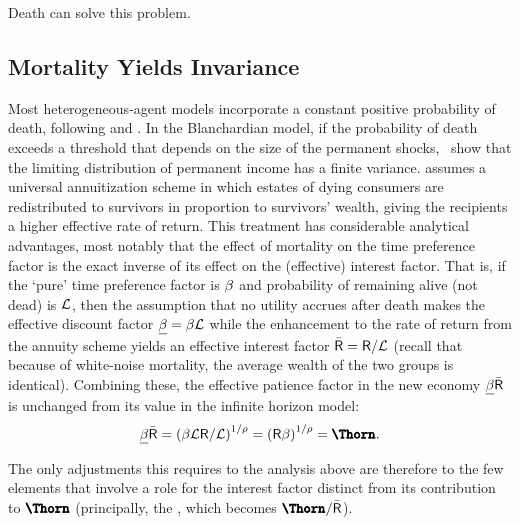 \documentclass[BufferStockTheory]{subfiles}
\begin{document}
Death can solve this problem.


\hypertarget{Mortality}{}
\subsection{Mortality Yields Invariance}\label{sec:Mortality}

\hypertarget{Blanchard-Lives}{}
Most heterogeneous-agent models incorporate a constant positive probability of death, following \cite{blanchardFinite} and \cite{yaari1965uncertain}.  In the Blanchardian model, if the probability of death exceeds a threshold that depends on the size of the permanent shocks,~\cite{cstwMPC} show that the limiting distribution of permanent income has a finite variance.  \cite{blanchardFinite} assumes a universal annuitization scheme in which estates of dying consumers are redistributed to survivors in proportion to survivors' wealth, giving the recipients a higher effective rate of return. This treatment has considerable analytical advantages, most notably that the effect of mortality on the time preference factor is the exact inverse of its effect on the (effective) interest factor.  That is, if the `pure' time preference factor is $\beta$ and probability of remaining alive (not dead) is $\mathcal{L}$, then the assumption that no utility accrues after death makes the effective discount factor $\underline{\beta}=\beta\mathcal{L}$  while the enhancement to the rate of return from the annuity scheme yields an effective interest factor $\bar{{\mathsf{R}}}={\mathsf{R}}/\mathcal{L}$ (recall that because of white-noise mortality, the average wealth of the two groups is identical).  Combining these, the effective patience factor in the new economy $\underline{\beta} \bar{{\mathsf{R}}}$ is unchanged from its value in the infinite horizon model:%
\begin{equation}
  \DiscFacLiv \RfreeEff = {\left(\DiscFac \Alive \Rfree / \Alive\right)}^{1/\CRRA} = {\left(\Rfree \DiscFacRaw\right)}^{1/\CRRA} = \APFac.
\end{equation}

The only adjustments this requires to the analysis above are therefore to the few elements that involve a role for the interest factor distinct from its contribution to $\APFac$ (principally, the {\RIC}, which becomes $\APFac/\RfreeEff$).  %
\end{document}
